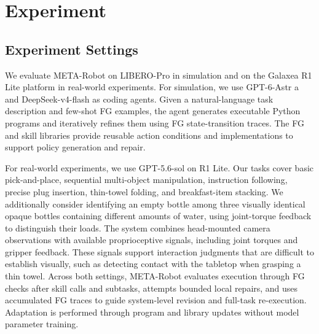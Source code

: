 \documentclass{article} %
\begin{document}
\section{Experiment}
\subsection{Experiment Settings}
We evaluate META-Robot on LIBERO-Pro in simulation and on the Galaxea R1 Lite platform in real-world experiments. For simulation, we use GPT-6-Astr a and DeepSeek-v4-flash as coding agents. Given a natural-language task description and few-shot FG examples, the agent generates executable Python programs and iteratively refines them using FG state-transition traces. The FG and skill libraries provide reusable action conditions and implementations to support policy generation and repair.

For real-world experiments, we use GPT-5.6-sol on R1 Lite. Our tasks cover basic pick-and-place, sequential multi-object manipulation, instruction following, precise plug insertion, thin-towel folding, and breakfast-item stacking. We additionally consider identifying an empty bottle among three visually identical opaque bottles containing different amounts of water, using joint-torque feedback to distinguish their loads. The system combines head-mounted camera observations with available proprioceptive signals, including joint torques and gripper feedback. These signals support interaction judgments that are difficult to establish visually, such as detecting contact with the tabletop when grasping a thin towel. Across both settings, META-Robot evaluates execution through FG checks after skill calls and subtasks, attempts bounded local repairs, and uses accumulated FG traces to guide system-level revision and full-task re-execution. Adaptation is performed through program and library updates without model parameter training.
\end{document}
